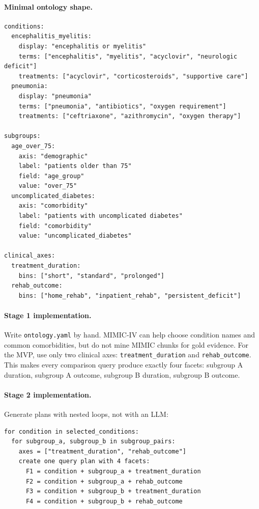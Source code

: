 \documentclass[11pt,a4paper]{article}
\newcommand{\field}[1]{\texttt{#1}}
\begin{document}
\paragraph{Minimal ontology shape.}

\begin{lstlisting}[style=promptstyle]
conditions:
  encephalitis_myelitis:
    display: "encephalitis or myelitis"
    terms: ["encephalitis", "myelitis", "acyclovir", "neurologic deficit"]
    treatments: ["acyclovir", "corticosteroids", "supportive care"]
  pneumonia:
    display: "pneumonia"
    terms: ["pneumonia", "antibiotics", "oxygen requirement"]
    treatments: ["ceftriaxone", "azithromycin", "oxygen therapy"]

subgroups:
  age_over_75:
    axis: "demographic"
    label: "patients older than 75"
    field: "age_group"
    value: "over_75"
  uncomplicated_diabetes:
    axis: "comorbidity"
    label: "patients with uncomplicated diabetes"
    field: "comorbidity"
    value: "uncomplicated_diabetes"

clinical_axes:
  treatment_duration:
    bins: ["short", "standard", "prolonged"]
  rehab_outcome:
    bins: ["home_rehab", "inpatient_rehab", "persistent_deficit"]
\end{lstlisting}

\paragraph{Stage 1 implementation.}
Write \field{ontology.yaml} by hand. MIMIC-IV can help choose condition names and common comorbidities, but do not mine MIMIC chunks for gold evidence. For the MVP, use only two clinical axes: \field{treatment\_duration} and \field{rehab\_outcome}. This makes every comparison query produce exactly four facets: subgroup A duration, subgroup A outcome, subgroup B duration, subgroup B outcome.

\paragraph{Stage 2 implementation.}
Generate plans with nested loops, not with an LLM:

\begin{lstlisting}[style=promptstyle]
for condition in selected_conditions:
  for subgroup_a, subgroup_b in subgroup_pairs:
    axes = ["treatment_duration", "rehab_outcome"]
    create one query plan with 4 facets:
      F1 = condition + subgroup_a + treatment_duration
      F2 = condition + subgroup_a + rehab_outcome
      F3 = condition + subgroup_b + treatment_duration
      F4 = condition + subgroup_b + rehab_outcome
\end{lstlisting}
\end{document}

